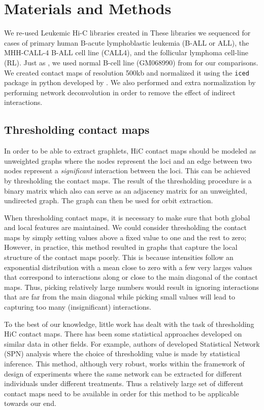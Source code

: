 \documentclass[a4,center,fleqn]{NAR}
\begin{document}
\section{Materials and Methods}
We re-used Leukemic Hi-C libraries 
created in \cite{wang2013properties}
These libraries we sequenced 
for cases of primary human B-acute
lymphoblastic leukemia (B-ALL or ALL), 
the MHH-CALL-4 B-ALL cell
line (CALL4), 
and the follicular lymphoma cell-line (RL).
Just as \cite{wang2013properties}, 
we used normal B-cell line (GM068990)
from \cite{lieberman2009comprehensive} 
for our comparisons.
We created contact maps of resolution
500kb and normalized it using 
the \texttt{iced} package in python
developed by \cite{servant2015hic}.
We also performed and extra normalization by
performing network deconvolution \cite{feizi2013network}
in order to remove
the effect of indirect interactions.



\subsection{Thresholding contact maps}
In order to be able to extract graphlets, HiC contact maps should be modeled as
unweighted graphs where the nodes represent the loci and an edge between two 
nodes represent a \textit{significant} interaction between the loci.
This can be achieved by thresholding the contact maps. The result
of the thresholding procedure is a binary matrix which also can serve as
an adjacency matrix for an unweighted, undirected graph. The graph can then be
used for orbit extraction.

When thresholding contact maps, it is necessary to make sure
that both global and local features are maintained. We could consider 
thresholding the contact maps by simply setting values above a fixed value to
one and the rest to zero; However, in practice, this method resulted in graphs
that capture the local structure of the contact maps poorly. This is because
intensities follow an exponential distribution with a mean close to zero
with a few very larges values that correspond to interactions along 
or close to the main diagonal of the contact maps.
Thus, picking relatively large numbers would result in ignoring interactions
that are far from the main diagonal while picking small values will lead to
capturing too many (insignificant) interactions.

To the best of our knowledge, little work has dealt with the task of
thresholding HiC contact maps. There has been some statistical approaches
developed on similar data in other fields. 
For example, authors of \cite{ginestet2011statistical} developed 
Statistical Network (SPN) analysis
where the choice of thresholding value is made by statistical inference.
This method, although very robust, works within the framework of 
design of experiments where the same
network can be extracted for different 
individuals under different treatments. Thus a relatively large
set of different contact maps need to be available in order for
this method to be applicable towards our end.
\end{document}
